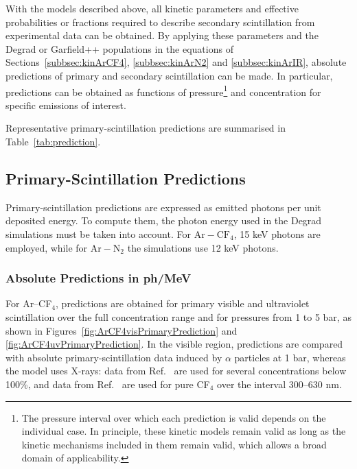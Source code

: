 \documentclass[12pt,a4paper]{article}
\newcommand{\N}{\mathrm{N}}
\newcommand{\Ar}{\mathrm{Ar}}
\newcommand{\CF}{\mathrm{CF}}
\begin{document}
With the models described above, all kinetic parameters and effective probabilities or fractions required to describe secondary scintillation from experimental data can be obtained. By applying these parameters and the Degrad or Garfield++ populations in the equations of Sections~\ref{subbsec:kinArCF4}, \ref{subbsec:kinArN2} and \ref{subbsec:kinArIR}, absolute predictions of primary and secondary scintillation can be made. In particular, predictions can be obtained as functions of pressure\footnote{The pressure interval over which each prediction is valid depends on the individual case. In principle, these kinetic models remain valid as long as the kinetic mechanisms included in them remain valid, which allows a broad domain of applicability.} and concentration for specific emissions of interest.

Representative primary-scintillation predictions are summarised in Table~\ref{tab:prediction}.



%


\subsection{Primary-Scintillation Predictions}

Primary-scintillation predictions are expressed as emitted photons per unit deposited energy. To compute them, the photon energy used in the Degrad simulations must be taken into account. For $\Ar-\CF_4$, 15 keV photons are employed, while for $\Ar-\N_2$ the simulations use 12 keV photons.

\subsubsection{Absolute Predictions in ph/MeV}

For Ar--CF$_4$, predictions are obtained for primary visible and ultraviolet scintillation over the full concentration range and for pressures from 1 to 5 bar, as shown in Figures~\ref{fig:ArCF4visPrimaryPrediction} and \ref{fig:ArCF4uvPrimaryPrediction}. In the visible region, predictions are compared with absolute primary-scintillation data induced by $\alpha$ particles at 1 bar, whereas the model uses X-rays: data from Ref.~\cite{amedo2023observation} are used for several concentrations below 100\%, and data from Ref.~\cite{lehaut2015scintillation} are used for pure CF$_4$ over the interval 300--630 nm.
\end{document}
